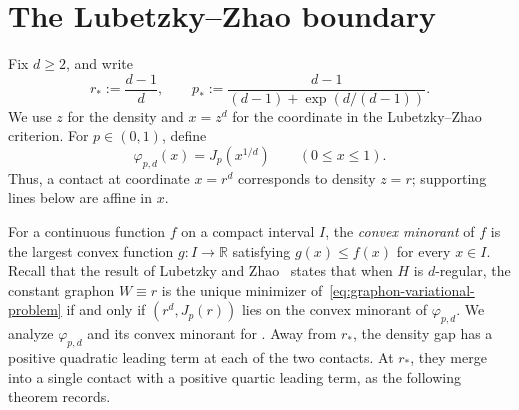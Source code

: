 \section{The Lubetzky--Zhao boundary}\label{sec:lz-boundary}
Fix $d\ge2$, and write
\[
  r_*:=\frac{d-1}{d},
  \qquad
  p_*:=\frac{d-1}{(d-1)+\exp(d/(d-1))}.
\]
We use $z$ for the density and $x=z^d$ for the coordinate in the
Lubetzky--Zhao criterion.  For $p\in(0,1)$, define
\[
  \varphi_{p,d}(x)=J_p(x^{1/d})\qquad (0\le x\le1).
\]
Thus, a contact at coordinate $x=r^d$ corresponds to density $z=r$;
supporting lines below are affine in $x$.

For a continuous function $f$ on a compact interval $I$, the \emph{convex minorant}
of $f$ is the largest convex function $g:I\to\mathbb R$ satisfying
$g(x)\le f(x)$ for every $x\in I$.
Recall that the result of Lubetzky and Zhao~\cite{lubetzky2015large} states
that when $H$ is $d$-regular, the constant graphon $W\equiv r$ is the unique minimizer
of~\eqref{eq:graphon-variational-problem} if and only if
$(r^d, J_p(r))$ lies on the convex minorant of $\varphi_{p,d}$.
We analyze $\varphi_{p,d}$ and its convex minorant for
.
Away from $r_*$, the density gap has a positive quadratic leading term at
each of the two contacts.  At $r_*$, they merge into a single contact with
a positive quartic leading term, as the following theorem records.
